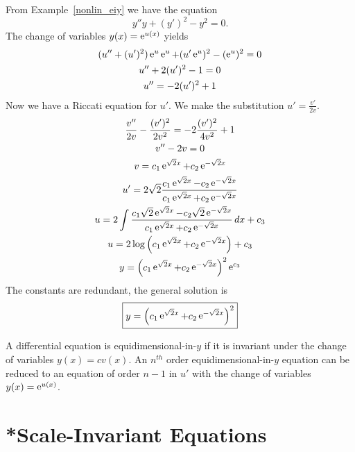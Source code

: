 \begin{Example}
  From Example~\ref{nonlin_eiy} we have the equation
  \[ y'' y + (y')^2 - y^2 = 0.\]
  The change of variables $y(x) = \mathop{\mathrm{e}}\nolimits^{u(x)}$ yields
  \begin{gather*}
    (u'' + (u')^2) \mathop{\mathrm{e}}\nolimits^u \mathop{\mathrm{e}}\nolimits^u + (u' \mathop{\mathrm{e}}\nolimits^u)^2 - (\mathop{\mathrm{e}}\nolimits^u)^2 = 0 \\
    u'' + 2(u')^2 - 1 = 0 \\
    u'' = -2 (u')^2 + 1 
  \end{gather*}
  Now we have a Riccati equation for $u'$.  
  We make the substitution $u' = \frac{v'}{2 v}$.
  \begin{gather*}
    \frac{v''}{2v} - \frac{(v')^2}{2v^2} = - 2 \frac{(v')^2}{4v^2} + 1 \\
    v'' - 2 v = 0 \\
    v = c_1 \mathop{\mathrm{e}}\nolimits^{\sqrt{2} x} + c_2 \mathop{\mathrm{e}}\nolimits^{-\sqrt{2} x} \\
    u' = 2 \sqrt{2} \frac{c_1 \mathop{\mathrm{e}}\nolimits^{\sqrt{2} x} - c_2 \mathop{\mathrm{e}}\nolimits^{-\sqrt{2} x}}
    {c_1 \mathop{\mathrm{e}}\nolimits^{\sqrt{2} x} + c_2 \mathop{\mathrm{e}}\nolimits^{-\sqrt{2} x}} \\
    u = 2 \int \frac{c_1 \sqrt{2} \mathop{\mathrm{e}}\nolimits^{\sqrt{2} x} 
      - c_2 \sqrt{2} \mathop{\mathrm{e}}\nolimits^{-\sqrt{2} x}}
    {c_1 \mathop{\mathrm{e}}\nolimits^{\sqrt{2} x} + c_2 \mathop{\mathrm{e}}\nolimits^{-\sqrt{2} x}} \,d x + c_3 \\
    u = 2 \log \left( c_1 \mathop{\mathrm{e}}\nolimits^{\sqrt{2} x} + c_2 \mathop{\mathrm{e}}\nolimits^{-\sqrt{2} x} \right) + c_3 \\
    y = \left( c_1 \mathop{\mathrm{e}}\nolimits^{\sqrt{2} x} + c_2 \mathop{\mathrm{e}}\nolimits^{-\sqrt{2} x} \right)^2 \mathop{\mathrm{e}}\nolimits^{c_3}
  \end{gather*}
  The constants are redundant, the general solution is
  \[
  \boxed{
    y = \left( c_1 \mathop{\mathrm{e}}\nolimits^{\sqrt{2} x} + c_2 \mathop{\mathrm{e}}\nolimits^{-\sqrt{2} x} \right)^2
    }
  \]
\end{Example}




\begin{Result}
  A differential equation is equidimensional-in-$y$ if it is invariant under 
  the change of variables $y(x) = c v(x)$.  An $n^{t h}$ order 
  equidimensional-in-$y$ equation can be reduced to an equation of order 
  $n-1$ in $u'$ with the change of variables $y(x) = \mathop{\mathrm{e}}\nolimits^{u(x)}$.
\end{Result}











\section{*Scale-Invariant Equations}



